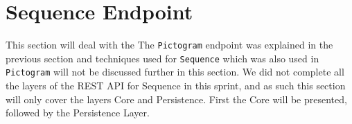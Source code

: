 \section{Sequence Endpoint}
This section will deal with the  
The \texttt{Pictogram} endpoint was explained in the previous section and techniques used for \texttt{Sequence} which was also used in \texttt{Pictogram} will not be discussed further in this section.
We did not complete all the layers of the REST API for Sequence in this sprint, and as such this section will only cover the layers Core and Persistence.
First the Core will be presented, followed by the Persistence Layer.